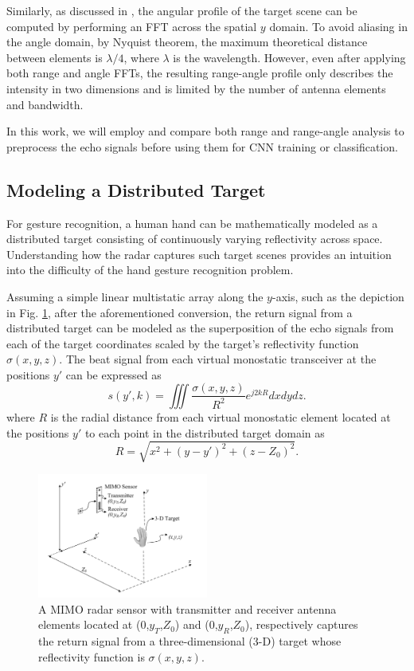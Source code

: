 \documentclass{ieeeaccess}
\begin{document}
Similarly, as discussed in \cite{TI:mmWave}, the angular profile of the target scene can be computed by performing an FFT across the spatial $y$ domain. To avoid aliasing in the angle domain, by Nyquist theorem, the maximum theoretical distance between elements is $\lambda/4$, where $\lambda$ is the wavelength. However, even after applying both range and angle FFTs, the resulting range-angle profile only describes the intensity in two dimensions and is limited by the number of antenna elements and bandwidth.

In this work, we will employ and compare both range and range-angle analysis to preprocess the echo signals before using them for CNN training or classification.

\subsection{Modeling a Distributed Target}
\label{subsec:distributed_target}
For gesture recognition, a human hand can be mathematically modeled as a distributed target consisting of continuously varying reflectivity across space. Understanding how the radar captures such target scenes provides an intuition into the difficulty of the hand gesture recognition problem.

Assuming a simple linear multistatic array along the $y$-axis, such as the depiction in Fig. \ref{fig:hand_scenario}, after the aforementioned conversion, the return signal from a distributed target can be modeled as the superposition of the echo signals from each of the target coordinates scaled by the target's reflectivity function $\sigma(x,y,z)$. The beat signal from each virtual monostatic transceiver at the positions $y'$ can be expressed as
\begin{equation}
\label{eq:distrubted_target}
    s(y',k) = \iiint \frac{\sigma(x,y,z)}{R^2}e^{j2kR}dxdydz.
\end{equation}
where $R$ is the radial distance from each virtual monostatic element located at the positions $y'$ to each point in the distributed target domain as 
\begin{equation}
    R = \sqrt{x^2 + (y-y')^2 + (z-Z_0)^2}.
\end{equation}

\begin{figure}[h]
    \centering
    \includegraphics[width=0.5\textwidth]{MIMO_hand_gesture_scenario.png}
    \caption{A MIMO radar sensor with transmitter and receiver antenna elements located at ($0$,$y_T$,$Z_0$) and ($0$,$y_R$,$Z_0$), respectively captures the return signal from a three-dimensional (3-D) target whose reflectivity function is $\sigma(x,y,z)$.}
    \label{fig:hand_scenario}
\end{figure}
\end{document}
